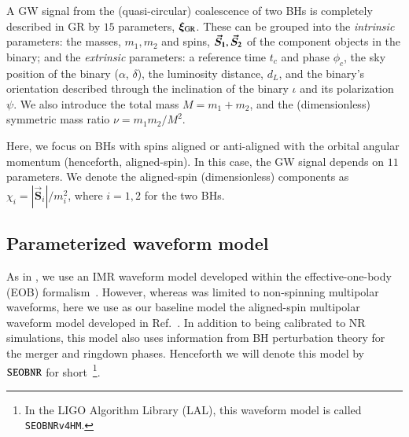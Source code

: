 A GW signal from the (quasi-circular) coalescence of two BHs is
completely described in GR by $15$ parameters,
$\bm{\xi}_{\text{GR}}$. These can be grouped into the \emph{intrinsic} parameters:
the  masses, $m_1, m_2$ and spins, $\bm{\vec{S}_{1}}, \bm{\vec{S}_{2}}$ of the component
objects in the binary; and the
\emph{extrinsic} parameters: a reference time $t_c$ and phase
$\phi_c$, the sky position of the binary ($\alpha$,
$\delta$), the luminosity distance, $d_L$, and the binary's orientation
described through the inclination of the binary $\iota$ and its
polarization $\psi$. We also introduce the total  mass $M = m_1+m_2$,
and the (dimensionless) symmetric mass ratio $\nu = m_1m_2/M^2$. 

Here, we focus on BHs with spins aligned or anti-aligned
with the orbital angular momentum (henceforth, aligned-spin). In this case,
the GW signal depends on $11$ parameters. We denote the
aligned-spin (dimensionless) components as $\chi_{i} = |\vec{\bm{S}}_i|/m^2_i$, where $i=1,2$ for the two BHs.

\subsection{Parameterized waveform model}\label{sec:model}

As in \paperone, we use an IMR waveform model developed within the effective-one-body (EOB)
formalism~\cite{Buonanno:1998gg,Buonanno:2000ef}. However, whereas \paperone was limited to non-spinning multipolar waveforms,
here we use as our baseline model the aligned-spin multipolar waveform model
developed in Ref.~\cite{Cotesta:2018fcv}. In addition to being
calibrated to NR simulations, this model also uses information from BH
perturbation theory for the merger and ringdown phases. Henceforth we
will denote this model by $\texttt{SEOBNR}$ for short~\footnote{In the LIGO Algorithm Library (LAL), this
waveform model is called {\tt SEOBNRv4HM}.}.


